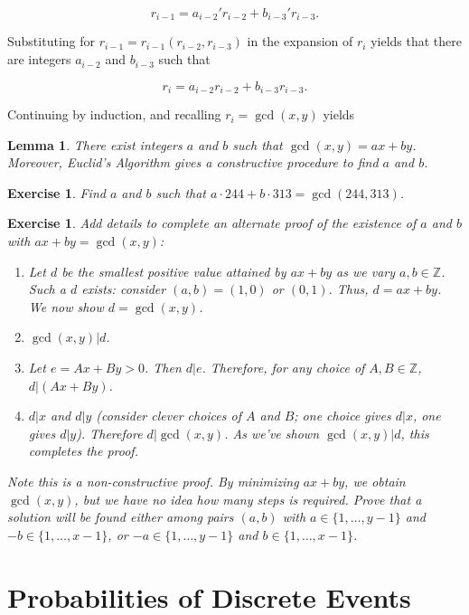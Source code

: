 \documentclass[12pt,letterpaper]{report}
\newcommand\be{\begin{equation}}
\newcommand\ee{\end{equation}}
\newcommand\ben{\begin{enumerate}}
\newcommand\een{\end{enumerate}}
\newcommand{\Z}{\ensuremath{\mathbb{Z}}}
\newtheorem{lem}[thm]{Lemma}
\newtheorem{exe}[thm]{Exercise}
\begin{document}
\be r_{i-1} = a_{i-2}' r_{i-2} + b_{i-3}' r_{i-3}. \ee

Substituting for $r_{i-1} = r_{i-1}(r_{i-2},r_{i-3})$ in the
expansion of $r_i$ yields that there are integers $a_{i-2}$ and
$b_{i-3}$ such that

\be r_i = a_{i-2} r_{i-2} + b_{i-3} r_{i-3}. \ee

Continuing by induction, and recalling $r_i = \gcd(x,y)$ yields

\begin{lem} There exist integers $a$ and $b$ such that $\gcd(x,y)
= ax + by$. Moreover, Euclid's Algorithm gives a constructive
procedure to find $a$ and $b$. \end{lem}

\begin{exe} Find $a$ and $b$ such that $a \cdot 244 + b \cdot 313 =
\gcd(244,313)$. \end{exe}

\begin{exe} Add details to complete an alternate proof of the
existence of $a$ and $b$ with $ax + by = \gcd(x,y)$:

\ben

\item Let $d$ be the smallest positive value attained by $ax + by$
as we vary $a, b \in \Z$. Such a $d$ exists: consider $(a,b) =
(1,0)$ or $(0,1)$. Thus, $d = ax + by$. We now show $d =
\gcd(x,y)$.

\item $\gcd(x,y) | d$.

\item Let $e = Ax + By > 0$. Then $d|e$. Therefore, for any choice
of $A, B \in \Z$, $d|(Ax+By)$.

\item $d|x$ and $d|y$ (consider clever choices of $A$ and $B$; one
choice gives $d|x$, one gives $d|y$). Therefore $d| \gcd(x,y)$. As
we've shown $\gcd(x,y)|d$, this completes the proof.

\een

Note this is a non-constructive proof. By minimizing $ax+by$, we
obtain $\gcd(x,y)$, but we have no idea how many steps is
required. Prove that a solution will be found either among pairs
$(a,b)$ with $a \in \{1, \dots, y-1\}$ and $-b \in \{1, \dots,
x-1\}$, or $-a \in \{1, \dots, y-1\}$ and $b \in \{1, \dots,
x-1\}$.

\end{exe}

\section{Probabilities of Discrete Events}
\end{document}
